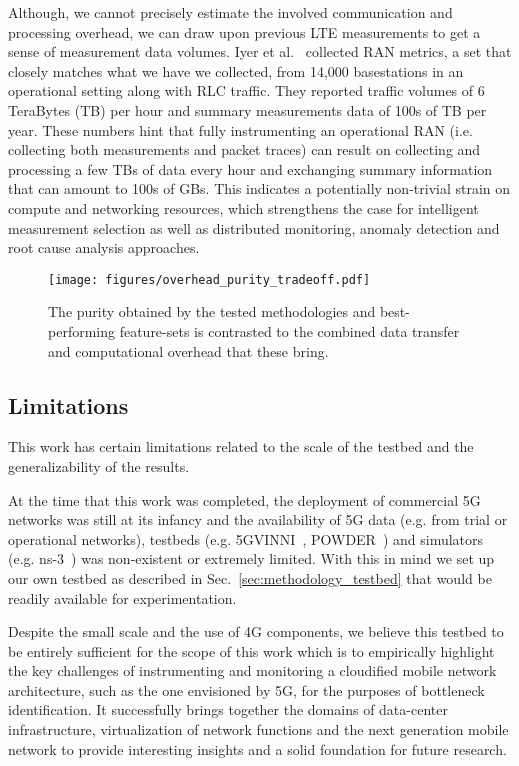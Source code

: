 \documentclass[journal,comsoc]{IEEEtran}
\begin{document}
%
Although, we cannot precisely estimate the involved communication and processing overhead, we can draw upon previous LTE measurements to get a sense of measurement data volumes.
Iyer et al.~\cite{iyer2017automating} collected RAN metrics, a set that closely matches what we have we collected, from 14,000 basestations in an operational setting along with RLC traffic.
They reported traffic volumes of 6 TeraBytes (TB) per hour and summary measurements data of 100s of TB per year.
These numbers hint that fully instrumenting an operational RAN (i.e. collecting both measurements and packet traces) can result on collecting and processing a few TBs of data every hour and exchanging summary information that can amount to 100s of GBs. 
This indicates a potentially non-trivial strain on compute and networking resources, which strengthens the case for intelligent measurement selection as well as distributed monitoring, anomaly detection and root cause analysis approaches. 


\begin{figure}[t]
	\centering
	\texttt{[image: figures/overhead\_purity\_tradeoff.pdf]}
	\vspace{-6mm}
	\caption{The purity obtained by the tested methodologies and best-performing feature-sets is contrasted to the combined data transfer and computational overhead that these bring.}
	\label{fig:overhead_purity}
\end{figure}

% 
\subsection{Limitations}
This work has certain limitations related to the scale of the testbed and the generalizability of the results.

At the time that this work was completed, the deployment of commercial 5G networks was still at its infancy and the availability of 5G data (e.g. from trial or operational networks), testbeds (e.g. 5GVINNI~\cite{5gvinni}, POWDER~\cite{powder}) and simulators (e.g. ns-3~\cite{ns3}) was non-existent or extremely limited.
With this in mind we set up our own testbed as described in Sec.~\ref{sec:methodology_testbed} that would be readily available for experimentation.

Despite the small scale and the use of 4G components, we believe this testbed to be entirely sufficient for the scope of this work which is to empirically highlight the key challenges of instrumenting and monitoring a cloudified mobile network architecture, such as the one envisioned by 5G, for the purposes of bottleneck identification. 
It successfully brings together the domains of data-center infrastructure, virtualization of network functions and the next generation mobile network to provide interesting insights and a solid foundation for future research.
\end{document}
